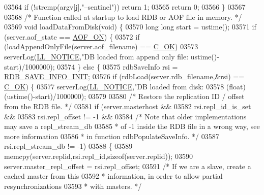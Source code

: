 \begin{DoxyCode}
{{{{{{{{{{{{{{{{{{{{{{{{{{{{{{{{{{{{{{{{{{{{{{{{{{{{{{{{{{{{{{{{{{{{{{{{{{{{{{{{{{{{{{{{{{{{{{{{{{{{{{{{{{{{{{{{{{{{{{{{{{{{{{{{{{{{{{{{{{{{{{{{{{{{{{{{{{{{{{{{{{{{{{{{{{{{03564         \textcolor{keywordflow}{if} (!strcmp(argv[j],\textcolor{stringliteral}{"--sentinel"})) \textcolor{keywordflow}{return} 1;
03565     \textcolor{keywordflow}{return} 0;
03566 \}
03567 
03568 \textcolor{comment}{/* Function called at startup to load RDB or AOF file in memory. */}
03569 \textcolor{keywordtype}{void} loadDataFromDisk(\textcolor{keywordtype}{void}) \{
03570     \textcolor{keywordtype}{long} \textcolor{keywordtype}{long} start = ustime();
03571     \textcolor{keywordflow}{if} (server.aof\_state == \hyperlink{server_8h_af6b151c9dced28e94c19479197113a83}{AOF\_ON}) \{
03572         \textcolor{keywordflow}{if} (loadAppendOnlyFile(server.aof\_filename) == \hyperlink{server_8h_a303769ef1065076e68731584e758d3e1}{C\_OK})
03573             serverLog(\hyperlink{server_8h_a8c54c191e436c7dd3012167212692401}{LL\_NOTICE},\textcolor{stringliteral}{"DB loaded from append only file: %
      ustime()-start)/1000000);
03574     \} \textcolor{keywordflow}{else} \{
03575         rdbSaveInfo rsi = \hyperlink{server_8h_a694b5ed5268bee8c50cc5b38fbec99ce}{RDB\_SAVE\_INFO\_INIT};
03576         \textcolor{keywordflow}{if} (rdbLoad(server.rdb\_filename,&rsi) == \hyperlink{server_8h_a303769ef1065076e68731584e758d3e1}{C\_OK}) \{
03577             serverLog(\hyperlink{server_8h_a8c54c191e436c7dd3012167212692401}{LL\_NOTICE},\textcolor{stringliteral}{"DB loaded from disk: %
03578                 (\textcolor{keywordtype}{float})(ustime()-start)/1000000);
03579 
03580             \textcolor{comment}{/* Restore the replication ID / offset from the RDB file. */}
03581             \textcolor{keywordflow}{if} (server.masterhost &&
03582                 rsi.repl\_id\_is\_set &&
03583                 rsi.repl\_offset != -1 &&
03584                 \textcolor{comment}{/* Note that older implementations may save a repl\_stream\_db}
03585 \textcolor{comment}{                 * of -1 inside the RDB file in a wrong way, see more information}
03586 \textcolor{comment}{                 * in function rdbPopulateSaveInfo. */}
03587                 rsi.repl\_stream\_db != -1)
03588             \{
03589                 memcpy(server.replid,rsi.repl\_id,\textcolor{keyword}{sizeof}(server.replid));
03590                 server.master\_repl\_offset = rsi.repl\_offset;
03591                 \textcolor{comment}{/* If we are a slave, create a cached master from this}
03592 \textcolor{comment}{                 * information, in order to allow partial resynchronizations}
03593 \textcolor{comment}{                 * with masters. */}
}}}}}}}}}}}}}}}}}}}}}}}}}}}}}}}}}}}}}}}}}}}}}}}}}}}}}}}}}}}}}}}}}}}}}}}}}}}}}}}}}}}}}}}}}}}}}}}}}}}}}}}}}}}}}}}}}}}}}}}}}}}}}}}}}}}}}}}}}}}}}}}}}}}}}}}}}}}}}}}}}}}}}}}}}}}}}}
\end{DoxyCode}

